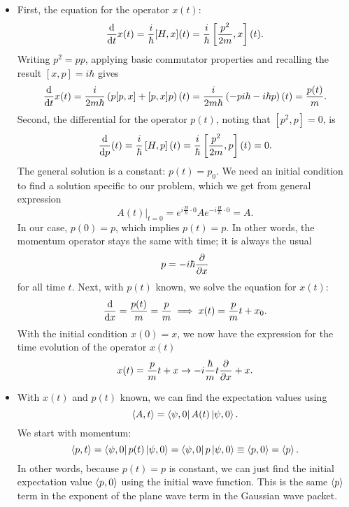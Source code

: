 \documentclass[11pt, a4paper]{article}
\begin{document}
\begin{itemize}
	\item First, the equation for the operator $ x(t) $:
	\begin{equation*}
		\dv{t}x(t) = \frac{i}{\hbar}[H, x](t) = \frac{i}{\hbar}\left [\frac{p^{2}}{2m}, x\right ](t).
	\end{equation*}
	Writing $ p^{2} = pp $, applying basic commutator properties and recalling the result $ [x, p] = i \hbar $ gives
	\begin{equation*}
		\dv{t}x(t) = \frac{i}{2m\hbar}\left(p[p, x] + [p, x]p\right)(t) = \frac{i}{2m\hbar}\left(-pi\hbar -i\hbar p\right)(t) = \frac{p(t)}{m}.
	\end{equation*}
	Second, the differential for the operator $ p(t) $, noting that $ [p^{2}, p] = 0 $, is
	\begin{equation*}
		\dv{p}(t) = \frac{i}{\hbar}\left[H, p\right](t) = \frac{i}{\hbar}\left[\frac{p^{2}}{2m}, p\right](t) = 0.
	\end{equation*}
	The general solution is a constant: $ p(t) = p_{0} $. We need an initial condition to find a solution specific to our problem, which we get from general expression
	\begin{equation*}
		A(t)\big |_{t = 0} = e^{i\frac{H}{\hbar}\cdot 0}Ae^{-i\frac{H}{\hbar}\cdot 0} = A.
	\end{equation*}
	In our case, $ p(0) = p $, which implies $ p(t) = p$. In other words, the momentum operator stays the same with time; it is always the usual
	\begin{equation*}
		p = -i\hbar \pdv{x}
	\end{equation*}
	for all time $ t $. Next, with $ p(t) $ known, we solve the equation for $ x(t) $:
	\begin{equation*}
		\dv{x} = \frac{p(t)}{m} = \frac{p}{m} \implies x(t) = \frac{p}{m}t + x_{0}.
	\end{equation*}
	With the initial condition $ x(0) = x $, we now have the expression for the time evolution of the operator $ x(t) $
	\begin{equation*}
		x(t) = \frac{p}{m}t + x \to -i\frac{\hbar}{m}t\pdv{x} + x.
	\end{equation*}
	
	\item With $ x(t) $ and $ p(t) $ known, we can find the expectation values using
	\begin{equation*}
		\ev{A, t} = \bra{\psi, 0} A(t) \ket{\psi, 0}.
	\end{equation*}
	We start with momentum:
	\begin{equation*}
		\ev{p, t} = \bra{\psi, 0} p(t) \ket{\psi, 0} = \bra{\psi, 0} p \ket{\psi, 0} \equiv \ev{p, 0} = \ev{p}.
	\end{equation*}
	In other words, because $ p(t) = p $ is constant, we can just find the initial expectation value $ \ev{p, 0} $ using the initial wave function. This is the same $ \ev{p} $ term in the exponent of the plane wave term in the Gaussian wave packet. 
	

\end{itemize}
\end{document}
